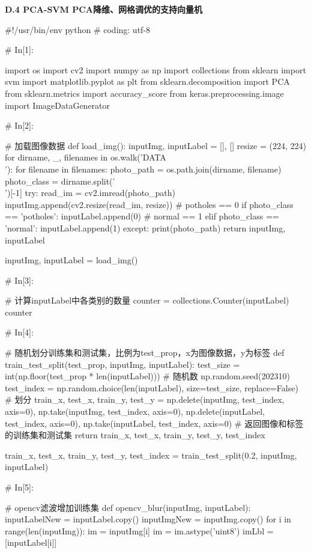 \documentclass{MathorCupmodeling}
\begin{document}
\textbf{D.4 PCA-SVM PCA降维、网格调优的支持向量机}
\begin{python}
#!/usr/bin/env python
# coding: utf-8

# In[1]:


import os
import cv2
import numpy as np
import collections
from sklearn import svm
import matplotlib.pyplot as plt
from sklearn.decomposition import PCA
from sklearn.metrics import accuracy_score
from keras.preprocessing.image import ImageDataGenerator


# In[2]:


# 加载图像数据
def load_img():
    inputImg, inputLabel = [], []
    resize = (224, 224)
    for dirname, _, filenames in os.walk('DATA\\'):
        for filename in filenames:
            photo_path = os.path.join(dirname, filename)
            photo_class = dirname.split('\\')[-1]
            try:
                read_im = cv2.imread(photo_path)
                inputImg.append(cv2.resize(read_im, resize))
                # potholes == 0
                if photo_class == 'potholes':
                    inputLabel.append(0)
                # normal == 1
                elif photo_class == 'normal':
                    inputLabel.append(1)
            except:
                print(photo_path)
    return inputImg, inputLabel


inputImg, inputLabel = load_img()

# In[3]:


# 计算inputLabel中各类别的数量
counter = collections.Counter(inputLabel)
counter


# In[4]:


# 随机划分训练集和测试集，比例为test_prop，x为图像数据，y为标签
def train_test_split(test_prop, inputImg, inputLabel):
    test_size = int(np.floor(test_prop * len(inputLabel)))
    # 随机数
    np.random.seed(202310)
    test_index = np.random.choice(len(inputLabel), size=test_size, replace=False)
    # 划分
    train_x, test_x, train_y, test_y = np.delete(inputImg, test_index, axis=0), np.take(inputImg, test_index, axis=0), np.delete(inputLabel, test_index, axis=0), np.take(inputLabel, test_index, axis=0)
    # 返回图像和标签的训练集和测试集
    return train_x, test_x, train_y, test_y, test_index


train_x, test_x, train_y, test_y, test_index = train_test_split(0.2, inputImg, inputLabel)


# In[5]:


# opencv滤波增加训练集
def opencv_blur(inputImg, inputLabel):
    inputLabelNew = inputLabel.copy()
    inputImgNew = inputImg.copy()
    for i in range(len(inputImg)):
        im = inputImg[i]
        im = im.astype('uint8')
        imLbl = [inputLabel[i]]


\end{python}
\end{document}
